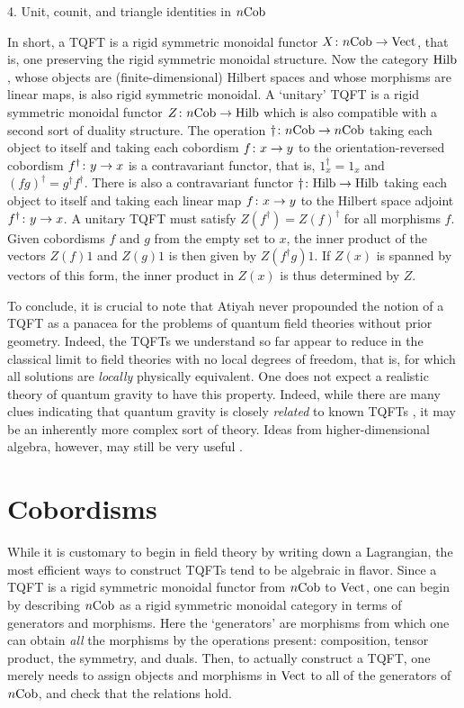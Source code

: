 4.  Unit, counit, and triangle identities in $n{\rm Cob}$
\efig

In short, a TQFT is a rigid symmetric monoidal functor $X \colon
n{\rm Cob} \to {\rm Vect}$, that is, one preserving the rigid symmetric
monoidal structure. Now the category ${\rm Hilb}$, whose objects are
(finite-dimensional) Hilbert spaces and whose morphisms are linear
maps, is also rigid symmetric monoidal.  A `unitary' TQFT is a
rigid symmetric monoidal functor $Z\colon n{\rm Cob} \to {\rm Hilb}$ which
is also compatible with a second  sort of duality structure.
The operation $\dagger \colon n{\rm Cob} \to n{\rm Cob}$ taking each object
to itself and taking each cobordism $f \colon x \to y$ to the
orientation-reversed cobordism $f^\dagger \colon y \to x$ is a
contravariant functor, that is, $1_x^\dagger = 1_x$  and
$(fg)^\dagger = g^\dagger f^\dagger$.   There is also a
contravariant functor $\dagger \colon {\rm Hilb} \to {\rm Hilb}$ taking each
object to itself and taking each linear map $f\colon x \to y$ to
the Hilbert space adjoint $f^\dagger \colon y \to x$.   A unitary
TQFT  must satisfy $Z(f^\dagger) = Z(f)^\dagger$ for all
morphisms $f$.   Given cobordisms $f$ and $g$ from the empty set
to $x$, the inner product of the vectors $Z(f)1$ and $Z(g)1$ is
then given by $Z(f^\dagger g)1$.  If $Z(x)$ is spanned by vectors
of this form, the inner product in $Z(x)$ is thus determined by $Z$.

To conclude, it is crucial to note that Atiyah never propounded the
notion of a TQFT as a panacea for the problems of quantum field
theories without prior geometry.  Indeed, the TQFTs we understand
so far appear to reduce in the classical limit to field theories
with no local degrees of freedom, that is, for which all
solutions are {\it locally} physically equivalent.  One does not
expect a realistic theory of quantum gravity to have this
property.    Indeed, while there are many clues indicating that
quantum gravity is closely {\it related} to known TQFTs
\cite{BaezKQG}, it may be an inherently more complex sort
of theory.   Ideas from higher-dimensional algebra, however, may
still be very useful \cite{Baez}.

\section{Cobordisms}

While it is customary to begin in field theory by writing down a
Lagrangian, the most efficient ways to construct TQFTs tend to be
algebraic in flavor.   Since a TQFT is a rigid symmetric monoidal
functor from $n{\rm Cob}$ to ${\rm Vect}$, one can begin by
describing $n{\rm Cob}$ as a rigid symmetric monoidal category in
terms of generators and morphisms.  Here the `generators' are
morphisms from which one can obtain {\it all} the morphisms by
the operations present:  composition, tensor product, the
symmetry, and duals.  Then, to actually construct a TQFT, one
merely needs to assign objects and morphisms in ${\rm Vect}$ to all of
the generators of $n{\rm Cob}$, and check that the relations hold.

